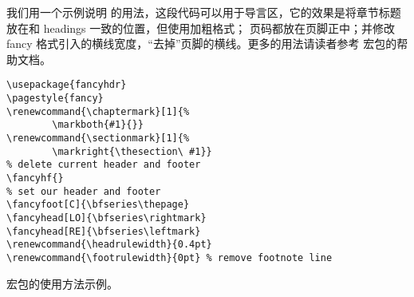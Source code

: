 我们用一个示例说明  的用法，这段代码可以用于导言区，它的效果是将章节标题放在和 headings 一致的位置，但使用加粗格式；
页码都放在页脚正中；并修改 fancy 格式引入的横线宽度，“去掉”页脚的横线。更多的用法请读者参考  宏包的帮助文档。

\begin{sourcecode}[hbp]
\begin{Verbatim}
\usepackage{fancyhdr}
\pagestyle{fancy}
\renewcommand{\chaptermark}[1]{%
        \markboth{#1}{}}
\renewcommand{\sectionmark}[1]{%
        \markright{\thesection\ #1}}
% delete current header and footer
\fancyhf{}
% set our header and footer
\fancyfoot[C]{\bfseries\thepage}
\fancyhead[LO]{\bfseries\rightmark}
\fancyhead[RE]{\bfseries\leftmark}
\renewcommand{\headrulewidth}{0.4pt}
\renewcommand{\footrulewidth}{0pt} % remove footnote line
\end{Verbatim}
\caption{ 宏包的使用方法示例。}
\end{sourcecode}

\endinput